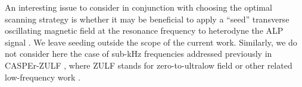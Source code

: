 \documentclass{WileyMSP-template}
\newcommand{\DK}[1]{\textcolor{brown}{Derek: #1}}
\begin{document}
	An interesting issue to consider in conjunction with choosing the optimal scanning strategy is whether it may be beneficial to apply a ``seed'' transverse oscillating magnetic field at the resonance frequency to heterodyne the ALP signal \cite{Aybas_2021_Quantum_sensitivity, Omarov_2022_Speedingaxionhaloscope}. We leave seeding outside the scope of the current work. Similarly, we do not consider here the case of sub-kHz frequencies addressed previously in CASPEr-ZULF \cite{Garcon_2019_Constraints, Wu_2019_Comagnetometer}, where ZULF stands for zero-to-ultralow field or other related low-frequency work \cite{Abel2017Electric_PRX, Terrano2019Axionlike23_PhysRevLett, Roussy2021AxionlikeSeven_PhysRevLett, BlochItay2022Floquet_sciadv}. 
\end{document}
